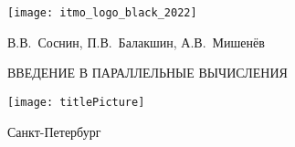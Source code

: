 
\thispagestyle{empty}
\begin{center}
    \texttt{[image: itmo\_logo\_black\_2022]}

    \vspace*{\fill}

    \begin{bfseries}
        \begin{Large}
            В.В.~Соснин, П.В.~Балакшин, А.В.~Мишенёв
        
            \vspace*{\fill}
        
            \centerline{ВВЕДЕНИЕ В ПАРАЛЛЕЛЬНЫЕ ВЫЧИСЛЕНИЯ}
        \end{Large}
     
        \vspace*{\fill}
        
        \texttt{[image: titlePicture]}
        
        \vspace*{\fill}
        
        \begin{large}
            Санкт-Петербург \\ \the\year
        \end{large}
    \end{bfseries}   
\end{center}
